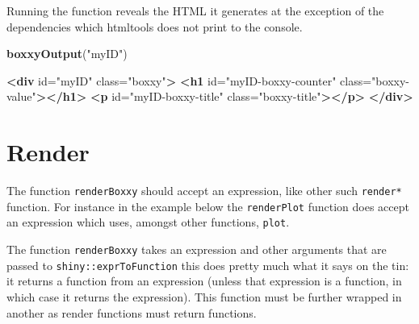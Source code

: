 \documentclass[
]{krantz}
\makeatletter
\newenvironment{Shaded}{\begin{snugshade}}{\end{snugshade}}
\newcommand{\CommentTok}[1]{\textcolor[rgb]{0.37,0.37,0.37}{\textit{#1}}}
\newcommand{\KeywordTok}[1]{\textcolor[rgb]{0.27,0.27,0.27}{\textbf{#1}}}
\newcommand{\NormalTok}[1]{#1}
\newcommand{\OperatorTok}[1]{\textcolor[rgb]{0.43,0.43,0.43}{\textbf{#1}}}
\newcommand{\OtherTok}[1]{\textcolor[rgb]{0.37,0.37,0.37}{#1}}
\newcommand{\StringTok}[1]{\textcolor[rgb]{0.5,0.5,0.5}{#1}}
\newenvironment{kframe}{%
\medskip{}
\setlength{\fboxsep}{.8em}
 \def\at@end@of@kframe{}%
 \ifinner\ifhmode%
  \def\at@end@of@kframe{\end{minipage}}%
  \begin{minipage}{\columnwidth}%
 \fi\fi%
 \def\FrameCommand##1{\hskip\@totalleftmargin \hskip-\fboxsep
 \colorbox{shadecolor}{##1}\hskip-\fboxsep
     \hskip-\linewidth \hskip-\@totalleftmargin \hskip\columnwidth}%
 \MakeFramed {\advance\hsize-\width
   \@totalleftmargin\z@ \linewidth\hsize
   \@setminipage}}%
 {\par\unskip\endMakeFramed%
 \at@end@of@kframe}
\renewenvironment{Shaded}{\begin{kframe}}{\end{kframe}}
\makeatother
\begin{document}
Running the function reveals the HTML it generates at the exception of the dependencies which htmltools does not print to the console.

\begin{Shaded}
\begin{Highlighting}[]
\KeywordTok{boxxyOutput}\NormalTok{(}\StringTok{"myID"}\NormalTok{)}
\end{Highlighting}
\end{Shaded}

\begin{Shaded}
\begin{Highlighting}[]
\KeywordTok{<div}\OtherTok{ id=}\StringTok{"myID"}\OtherTok{ class=}\StringTok{"boxxy"}\KeywordTok{>}
  \KeywordTok{<h1}\OtherTok{ id=}\StringTok{"myID{-}boxxy{-}counter"}\OtherTok{ class=}\StringTok{"boxxy{-}value"}\KeywordTok{></h1>}
  \KeywordTok{<p}\OtherTok{ id=}\StringTok{"myID{-}boxxy{-}title"}\OtherTok{ class=}\StringTok{"boxxy{-}title"}\KeywordTok{></p>}
\KeywordTok{</div>}
\end{Highlighting}
\end{Shaded}

\hypertarget{render}{%
\section{Render}\label{render}}

The function \texttt{renderBoxxy} should accept an expression, like other such \texttt{render*} function. For instance in the example below the \texttt{renderPlot} function does accept an expression which uses, amongst other functions, \texttt{plot}.

\begin{Shaded}
\end{Shaded}

The function \texttt{renderBoxxy} takes an expression and other arguments that are passed to \texttt{shiny::exprToFunction} this does pretty much what it says on the tin: it returns a function from an expression (unless that expression is a function, in which case it returns the expression). This function must be further wrapped in another as render functions must return functions.
\end{document}
